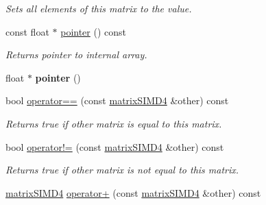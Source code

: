 \begin{DoxyCompactItemize}
\begin{DoxyCompactList}\small\item\em Sets all elements of this matrix to the value. \end{DoxyCompactList}\item 
const float $\ast$ \hyperlink{classirr_1_1core_1_1matrixSIMD4_ad15fadf0bc34bbfcc291b63515c3d0b1}{pointer} () const \hypertarget{classirr_1_1core_1_1matrixSIMD4_ad15fadf0bc34bbfcc291b63515c3d0b1}{}\label{classirr_1_1core_1_1matrixSIMD4_ad15fadf0bc34bbfcc291b63515c3d0b1}

\begin{DoxyCompactList}\small\item\em Returns pointer to internal array. \end{DoxyCompactList}\item 
float $\ast$ {\bfseries pointer} ()\hypertarget{classirr_1_1core_1_1matrixSIMD4_a2c24310eb7ea4bd9ba3c1dc9d46f2dba}{}\label{classirr_1_1core_1_1matrixSIMD4_a2c24310eb7ea4bd9ba3c1dc9d46f2dba}

\item 
bool \hyperlink{classirr_1_1core_1_1matrixSIMD4_ad8ca705dc0d7f65966297e20d0f3c7db}{operator==} (const \hyperlink{classirr_1_1core_1_1matrixSIMD4}{matrix\+S\+I\+M\+D4} \&other) const \hypertarget{classirr_1_1core_1_1matrixSIMD4_ad8ca705dc0d7f65966297e20d0f3c7db}{}\label{classirr_1_1core_1_1matrixSIMD4_ad8ca705dc0d7f65966297e20d0f3c7db}

\begin{DoxyCompactList}\small\item\em Returns true if other matrix is equal to this matrix. \end{DoxyCompactList}\item 
bool \hyperlink{classirr_1_1core_1_1matrixSIMD4_acd89bfa917872620dbe290874a1406a5}{operator!=} (const \hyperlink{classirr_1_1core_1_1matrixSIMD4}{matrix\+S\+I\+M\+D4} \&other) const \hypertarget{classirr_1_1core_1_1matrixSIMD4_acd89bfa917872620dbe290874a1406a5}{}\label{classirr_1_1core_1_1matrixSIMD4_acd89bfa917872620dbe290874a1406a5}

\begin{DoxyCompactList}\small\item\em Returns true if other matrix is not equal to this matrix. \end{DoxyCompactList}\item 
\hyperlink{classirr_1_1core_1_1matrixSIMD4}{matrix\+S\+I\+M\+D4} \hyperlink{classirr_1_1core_1_1matrixSIMD4_a0547eb39a2cf07f716db8541aec2083e}{operator+} (const \hyperlink{classirr_1_1core_1_1matrixSIMD4}{matrix\+S\+I\+M\+D4} \&other) const \hypertarget{classirr_1_1core_1_1matrixSIMD4_a0547eb39a2cf07f716db8541aec2083e}{}\label{classirr_1_1core_1_1matrixSIMD4_a0547eb39a2cf07f716db8541aec2083e}


\end{DoxyCompactItemize}
